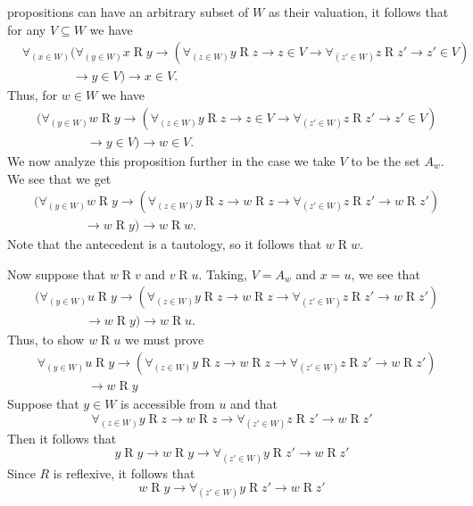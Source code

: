 \documentclass{article}
\begin{document}
\begin{ex}
\begin{enumerate}
propositions can have an arbitrary subset of $W$ as their valuation, it follows
that for any $V\subseteq W$ we have
\begin{align*}
& \forall_{(x\in W)}
  (\forall_{(y\in W)} x\mathbin{R}y
  \to (\forall_{(z\in W)} y\mathbin{R}z\to z\in V\to\forall_{(z'\in W)} z\mathbin{R} z'\to z'\in V)
  \\
  & \qquad\qquad \to y\in V) \to x\in V.
\end{align*}
Thus, for $w\in W$ we have
\begin{align*}
& (\forall_{(y\in W)} w\mathbin{R}y
  \to (\forall_{(z\in W)} y\mathbin{R}z\to z\in V\to\forall_{(z'\in W)} z\mathbin{R} z'\to z'\in V)
  \\
  & \qquad\qquad \to y\in V) \to w\in V.
\end{align*}
We now analyze this proposition further in the case we take $V$ to be the
set $A_w$. We see that we get
\begin{align*}
& (\forall_{(y\in W)} w\mathbin{R}y
  \to (\forall_{(z\in W)} y\mathbin{R}z\to w\mathbin{R}z\to\forall_{(z'\in W)} z\mathbin{R} z'\to w\mathbin{R} z')
  \\
  & \qquad\qquad \to w\mathbin{R}y) \to w\mathbin{R} w.
\end{align*}
Note that the antecedent is a tautology, so it follows that $w\mathbin{R} w$.

Now suppose that $w\mathbin{R} v$ and $v\mathbin{R} u$. Taking, $V=A_w$ and
$x=u$, we see that
\begin{align*}
& (\forall_{(y\in W)} u\mathbin{R}y
  \to (\forall_{(z\in W)} y\mathbin{R}z\to w\mathbin{R}z\to\forall_{(z'\in W)} z\mathbin{R} z'\to w\mathbin{R} z')
  \\
  & \qquad\qquad \to w\mathbin{R}y) \to w\mathbin{R} u.
\end{align*}
Thus, to show $w\mathbin{R} u$ we must prove
\begin{align*}
& \forall_{(y\in W)} u\mathbin{R}y
  \to (\forall_{(z\in W)} y\mathbin{R}z\to w\mathbin{R}z\to\forall_{(z'\in W)} z\mathbin{R} z'\to w\mathbin{R} z')
  \\
  & \qquad\qquad \to w\mathbin{R}y
\end{align*}
Suppose that $y\in W$ is accessible from $u$ and that
\begin{equation*}
\forall_{(z\in W)} y\mathbin{R}z\to w\mathbin{R}z\to\forall_{(z'\in W)} z\mathbin{R} z'\to w\mathbin{R} z'
\end{equation*}
Then it follows that
\begin{equation*}
y\mathbin{R}y\to w\mathbin{R}y\to\forall_{(z'\in W)} y\mathbin{R} z'\to w\mathbin{R} z'
\end{equation*}
Since $R$ is reflexive, it follows that
\begin{equation*}
w\mathbin{R}y\to\forall_{(z'\in W)} y\mathbin{R} z'\to w\mathbin{R} z'
\end{equation*}
\end{enumerate}
\end{ex}
\end{document}
